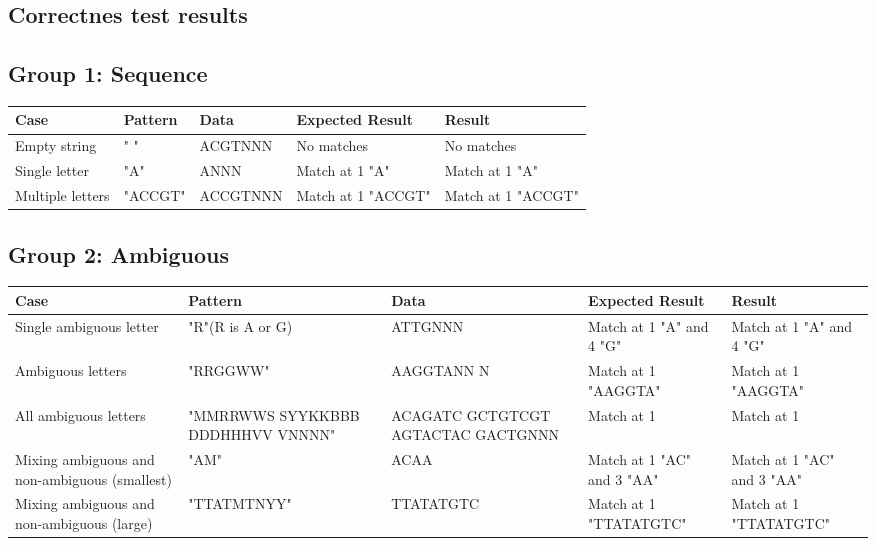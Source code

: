 \documentclass[12pt]{article}
\begin{document}
\begin{appendices}
\section{Correctnes test results}
\subsection{Group 1: Sequence}
\begin{table}[H]
\begin{tabular}{p{4cm}|p{3.6cm}|p{2.5cm}|p{2.2cm}|p{2.2cm}}
Case 			& Pattern & Data & Expected Result & Result \\ \hline
\rowcolor{lightgreen} 
Empty string		& " " & ACGTNNN & No matches & No matches \\ \hline
\rowcolor{lightgreen}
Single letter 		& "A" & ANNN & Match at 1 "A" & Match at 1 "A"\\ \hline
\rowcolor{lightgreen}
Multiple letters	& "ACCGT" & ACCGTNNN & Match at 1 "ACCGT" & Match at 1 "ACCGT" \\ \hline
\end{tabular}
\end{table}
\subsection{Group 2: Ambiguous}
\begin{table}[H]
\begin{tabular}{p{4cm}|p{3.6cm}|p{2.5cm}|p{2.2cm}|p{2.2cm}}
Case 			& Pattern & Data & Expected Result & Result \\ \hline
\rowcolor{lightgreen}
Single ambiguous letter & "R"(R is A or G) & ATTGNNN & Match at 1 "A" and 4 "G" & Match at 1 "A" and 4 "G" \\ \hline
\rowcolor{lightgreen}
Ambiguous letters	& "RRGGWW" & AAGGTANN N & Match at 1 "AAGGTA" & Match at 1 "AAGGTA" \\ \hline
\rowcolor{lightgreen}
All ambiguous letters & "MMRRWWS SYYKKBBB DDDHHHVV VNNNN" & ACAGATC GCTGTCGT AGTACTAC GACTGNNN & Match at 1 & 
Match at 1 \\ \hline
\rowcolor{lightgreen}
Mixing ambiguous and non-ambiguous (smallest)& "AM" & ACAA & Match at 1 "AC" and 3 "AA" & Match at 1 "AC" and 3 "AA" \\ \hline
\rowcolor{lightgreen}
Mixing ambiguous and non-ambiguous (large)& "TTATMTNYY" & TTATATGTC & Match at 1 "TTATATGTC" & Match at 1 "TTATATGTC"
\end{tabular}
\end{table}

\end{appendices}
\end{document}
